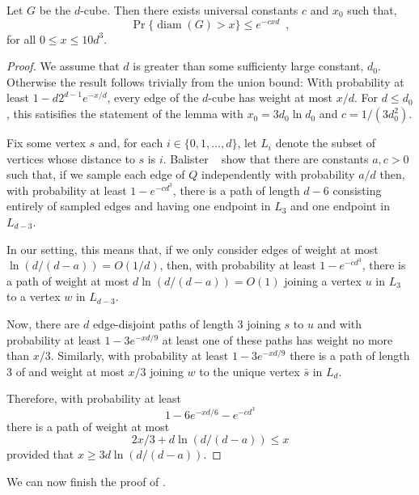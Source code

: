 \documentclass{patmorin}
\DeclareMathOperator{\diam}{diam}
\begin{document}
\begin{lem}
   Let $G$ be the $d$-cube.  Then there exists universal constants
   $c$ and $x_0$ such that,
   \[ 
     \Pr\{\diam(G) > x\} \le e^{-cxd} \enspace ,
   \]
   for all $0 \le x \le 10d^3$.
\end{lem}

\begin{proof}
   We assume that $d$ is greater than some sufficienty large constant,
   $d_0$.  Otherwise the result follows trivially from the union bound:
   With probability at least $1-d2^{d-1} e^{-x/d}$, every edge of the
   $d$-cube has weight at most $x/d$.  For $d \le d_0$, this satisifies
   the statement of the lemma with $x_0=3d_0\ln d_0$ and $c=1/(3d_0^2)$.

   Fix some vertex $s$ and, for each $i\in\{0,1,\ldots,d\}$, let
   $L_i$ denote the subset of vertices whose distance to $s$ is $i$.
   Balister \etal\ \cite[Proof of Lemma~4]{balister.bollobas.ea:first}
   show that there are constants $a,c>0$ such that, if we sample each edge
   of $Q$ independently with probability $a/d$ then, with probability
   at least $1-e^{-cd^3}$, there is a path of length $d-6$ consisting
   entirely of sampled edges and having one endpoint in $L_3$ and one
   endpoint in $L_{d-3}$.

   In our setting, this means that, if we only consider edges of weight
   at most $\ln(d/(d-a)) = O(1/d)$, then, with probability at least
   $1-e^{-cd^3}$, there is a path of weight at most $d\ln(d/(d-a))=O(1)$
   joining a vertex $u$ in $L_3$ to a vertex $w$ in $L_{d-3}$.

   Now, there are $d$ edge-disjoint paths of length $3$ joining $s$ to $u$
   and with probability at least $1-3e^{-x d/9}$ at least one of these
   paths has weight no more than $x/3$.  Similarly, with probability
   at least $1-3e^{-xd/9}$ there is a path of length 3 of and weight at
   most $x/3$ joining $w$ to the unique vertex $\bar{s}$ in $L_d$.

   Therefore, with probability at least
   \[
      1-6e^{-xd/6}-e^{-cd^3}
   \]
   there is a path of weight at most
   \[
          2x/3 + d\ln(d/(d-a))  \le x
   \]
   provided that $x \ge 3d\ln(d/(d-a))$.
\end{proof}

We can now finish the proof of .
\end{document}
